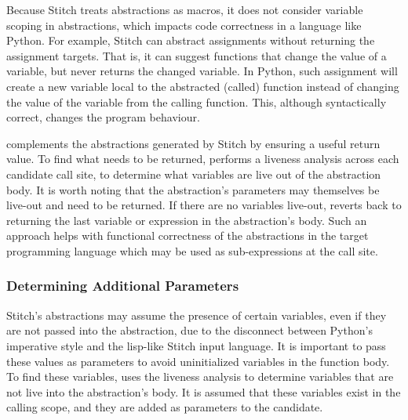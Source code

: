 Because Stitch treats abstractions as macros, it does not consider variable scoping in abstractions, which impacts code correctness in a language like Python. For example, Stitch can abstract assignments without returning the assignment targets. That is, it can suggest functions that change the value of a variable, but never returns the changed variable. In Python, such assignment will create a new variable local to the abstracted (called) function instead of changing the value of the variable from the calling function. This, although syntactically correct, changes the program behaviour.

\toolname complements the abstractions generated by Stitch by ensuring a useful return value. To find what needs to be returned, \toolname performs a liveness analysis across each candidate call site, to determine what variables are live out of the abstraction body. 
It is worth noting that the abstraction's parameters may themselves be live-out and need to be returned. If there are no variables live-out, \toolname reverts back to returning the last variable or expression in the abstraction’s body. Such an approach helps with functional correctness of the abstractions in the target programming language which may be used as sub-expressions at the call site. 

\subsubsection{Determining Additional Parameters} 
Stitch's abstractions may assume the presence of certain variables, even if they are not passed into the abstraction, due to the disconnect between Python's imperative style and the lisp-like Stitch input language. 
It is important to pass these values as parameters to avoid uninitialized variables in the function body. To find these variables, \toolname uses the liveness analysis to determine variables that are not live into the abstraction's body. It is assumed that these variables exist in the calling scope, and they are added as parameters to the candidate.


